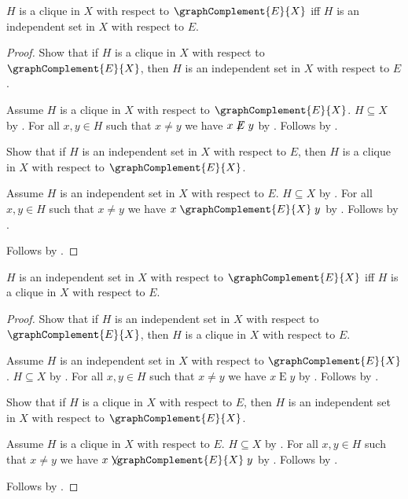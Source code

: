 \begin{proposition}\label{graph_complement_clique_iff}
    $H$ is a clique in $X$ with respect to $\graphComplement{E}{X}$ iff
        $H$ is an independent set in $X$ with respect to $E$.
\end{proposition}
\begin{proof}
    Show that if $H$ is a clique in $X$ with respect to
            $\graphComplement{E}{X}$, then
        $H$ is an independent set in $X$ with respect to $E$.
    \begin{subproof}
        Assume $H$ is a clique in $X$ with respect to
            $\graphComplement{E}{X}$.
        $H\subseteq X$ by .
        For all $x,y\in H$ such that $x\neq y$ we have
            $x\not\mathrel{E}y$ by
            .
        Follows by .
    \end{subproof}
    Show that if $H$ is an independent set in $X$ with respect to $E$, then
        $H$ is a clique in $X$ with respect to
            $\graphComplement{E}{X}$.
    \begin{subproof}
        Assume $H$ is an independent set in $X$ with respect to $E$.
        $H\subseteq X$ by .
        For all $x,y\in H$ such that $x\neq y$ we have
            $x\mathrel{\graphComplement{E}{X}}y$ by
            .
        Follows by .
    \end{subproof}
    Follows by \auto.
\end{proof}

\begin{proposition}\label{graph_complement_independent_iff}
    $H$ is an independent set in $X$ with respect to
            $\graphComplement{E}{X}$ iff
        $H$ is a clique in $X$ with respect to $E$.
\end{proposition}
\begin{proof}
    Show that if $H$ is an independent set in $X$ with respect to
            $\graphComplement{E}{X}$, then
        $H$ is a clique in $X$ with respect to $E$.
    \begin{subproof}
        Assume $H$ is an independent set in $X$ with respect to
            $\graphComplement{E}{X}$.
        $H\subseteq X$ by .
        For all $x,y\in H$ such that $x\neq y$ we have
            $x\mathrel{E}y$ by
            .
        Follows by .
    \end{subproof}
    Show that if $H$ is a clique in $X$ with respect to $E$, then
        $H$ is an independent set in $X$ with respect to
            $\graphComplement{E}{X}$.
    \begin{subproof}
        Assume $H$ is a clique in $X$ with respect to $E$.
        $H\subseteq X$ by .
        For all $x,y\in H$ such that $x\neq y$ we have
            $x\not\mathrel{\graphComplement{E}{X}}y$ by
            .
        Follows by .
    \end{subproof}
    Follows by \auto.
\end{proof}
